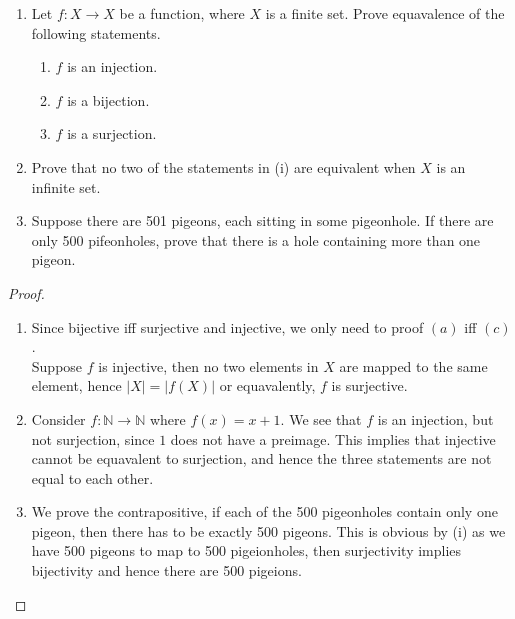 \documentclass[15pt]{article}
\newenvironment{exercise}[2][Exercise]{\begin{trivlist}
\item[\hskip \labelsep {\bfseries #1}\hskip \labelsep {\bfseries #2.}]}
{\end{trivlist}}
\begin{document}
\begin{exercise}{1.8 (Pigeonhole Principle)}
    \begin{enumerate}

        \item[(i)] Let $f:X\rightarrow X$ be a function, where $X$ is a finite set. Prove equavalence of the following statements.
        \begin{enumerate}
            \item[(a)] $f$ is an injection.
            \item[(b)] $f$ is a bijection.
            \item[(c)] $f$ is a surjection.
        \end{enumerate}

        \item[(ii)] Prove that no two of the statements in (i) are equivalent when $X$ is an infinite set.
        \item[(iii)] Suppose there are 501 pigeons, each sitting in some pigeonhole. If there are only 500 pifeonholes, prove that there is a hole containing more than one pigeon.
    \end{enumerate}
\end{exercise}

\begin{proof}

    \begin{enumerate}
        \item[(i)] Since bijective iff surjective and injective, we only need to proof $(a)$ iff $(c)$. \\
        Suppose $f$ is injective, then no two elements in $X$ are mapped to the same element, hence $|X|=|f(X)|$ or equavalently, $f$ is surjective.

        \item[(ii)] Consider $f:\mathbb{N} \rightarrow \mathbb{N}$ where $f(x)=x+1$. We see that $f$ is an injection, but not surjection, since $1$ does not have a preimage. This implies that injective cannot be equavalent to surjection, and hence the three statements are not equal to each other.
        \item[(iii)] We prove the contrapositive, if each of the 500 pigeonholes contain only one pigeon, then there has to be exactly 500 pigeons. This is obvious by (i) as we have 500 pigeons to map to 500 pigeionholes, then surjectivity implies bijectivity and hence there are 500 pigeions.
    \end{enumerate}

\end{proof}
\end{document}
